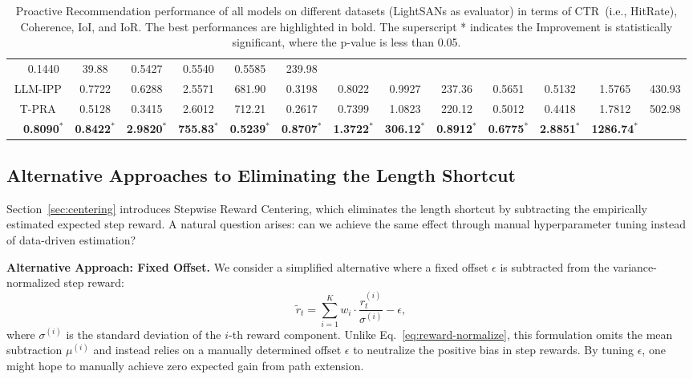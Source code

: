 \documentclass{llmxive}
\begin{document}
\begin{table}[t]
{\begin{tabular}{c c cccc cccc cccc}
            & 0.1440 & 39.88 & 0.5427 & 0.5540 & 0.5585 & 239.98 \\
            \multicolumn{2}{c}{LLM-IPP}
            & 0.7722 & 0.6288 & 2.5571 & 681.90 & 0.3198 & 0.8022
            & 0.9927 & 237.36 & 0.5651 & 0.5132 & 1.5765 & 430.93 \\
            \multicolumn{2}{c}{T-PRA}
            & 0.5128 & 0.3415 & 2.6012 & 712.21 & 0.2617 & 0.7399
            & 1.0823 & 220.12 & 0.5012 & 0.4418 & 1.7812 & 502.98 \\
        \hline
        \midrule
            \rowcolor{tableours}
            \multicolumn{2}{c}{\textbf{ProRL (Ours)}}
            & \textbf{0.8090}$^{*}$ & \textbf{0.8422}$^{*}$ & \textbf{2.9820}$^{*}$ & \textbf{755.83}$^{*}$ & \textbf{0.5239}$^{*}$ & \textbf{0.8707}$^{*}$ &
            \textbf{1.3722}$^{*}$ & \textbf{306.12}$^{*}$ & \textbf{0.8912}$^{*}$ & \textbf{0.6775}$^{*}$ & \textbf{2.8851}$^{*}$ & \textbf{1286.74}$^{*}$ \\
      \bottomrule[1.5pt]
      \end{tabular}
      }
\caption{Proactive Recommendation performance of all models on different datasets (LightSANs as evaluator) in terms of CTR~(i.e., HitRate), Coherence, IoI, and IoR. The best performances are highlighted in bold. The superscript * indicates the Improvement is statistically significant, where the p-value is less than 0.05.}
\label{tab:lightsans_comparison}
\end{table}

\subsection{Alternative Approaches to Eliminating the Length Shortcut}
\label{app:alternatives}

Section~\ref{sec:centering} introduces Stepwise Reward Centering, which eliminates the length shortcut by subtracting the empirically estimated expected step reward. A natural question arises: can we achieve the same effect through manual hyperparameter tuning instead of data-driven estimation?

\textbf{Alternative Approach: Fixed Offset.} We consider a simplified alternative where a fixed offset $\epsilon$ is subtracted from the variance-normalized step reward:
\begin{equation}
\tilde{r}_t = \sum_{i=1}^{K} w_i \cdot \frac{r_t^{(i)}}{\sigma^{(i)}} - \epsilon,
\end{equation}
where $\sigma^{(i)}$ is the standard deviation of the $i$-th reward component. Unlike Eq.~\eqref{eq:reward-normalize}, this formulation omits the mean subtraction $\mu^{(i)}$ and instead relies on a manually determined offset $\epsilon$ to neutralize the positive bias in step rewards. By tuning $\epsilon$, one might hope to manually achieve zero expected gain from path extension.
\end{document}
